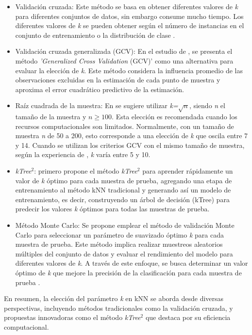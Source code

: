 \begin{itemize}
	\item Validación cruzada: Este método se basa en obtener diferentes valores de \textit{k} para diferentes conjuntos de datos, sin embargo consume mucho tiempo. Los diferentes valores de \textit{k} se pueden obtener según el número de instancias en el conjunto de entrenamiento o la distribución de clase \citep{zhang2017efficient}.
	\item Validación cruzada generalizada (GCV): En el estudio de \citep{wahba1975smoothing}, se presenta el método \textit{'Generalized Cross Validation} (GCV)' como una alternativa para evaluar la elección de \textit{k}. Este método considera la influencia promedio de las observaciones excluidas en la estimación de cada punto de muestra y aproxima el error cuadrático predictivo de la estimación. 
	\item Raíz cuadrada de la muestra: En \citep{lall1996nearest} se sugiere utilizar \textit{k=}$\sqrt{n}$, siendo \textit{n} el tamaño de la muestra y $n\geq100$. Esta elección es recomendada cuando los recursos computacionales son limitados. Normalmente, con un tamaño de muestra \textit{n} de 50 a 200, esto corresponde a una elección de \textit{k} que oscila entre 7 y 14. Cuando se utilizan los criterios GCV con el mismo tamaño de muestra, según la experiencia de \citep{lall1996nearest}, \textit{k} varía entre 5 y 10. 
	\item \textit{kTree}$^{2}$: \citep{zhang2014predicting} primero propone el método \textit{kTree}$^{2}$ para aprender rápidamente un valor de \textit{k} óptimo para cada muestra de prueba, agregando una etapa de entrenamiento al método kNN tradicional y generando así un modelo de entrenamiento, es decir, construyendo un árbol de decisión (kTree) para predecir los valores \textit{k} óptimos para todas las muestras de prueba.
	\item Método Monte Carlo: Se propone emplear el método de validación Monte Carlo para seleccionar un parámetro de suavizado óptimo \textit{k} para cada muestra de prueba. Este método implica realizar muestreos aleatorios múltiples del conjunto de datos y evaluar el rendimiento del modelo para diferentes valores de \textit{k}. A través de este enfoque, se busca determinar un valor óptimo de \textit{k} que mejore la precisión de la clasificación para cada muestra de prueba \citep{zhang2017efficient}. 
\end{itemize}
En resumen, la elección del parámetro \textit{k} en kNN se aborda desde diversas perspectivas, incluyendo métodos tradicionales como la validación cruzada, y propuestas innovadoras como el método \textit{kTree}$^{2}$ que destaca por su eficiencia computacional. \\

